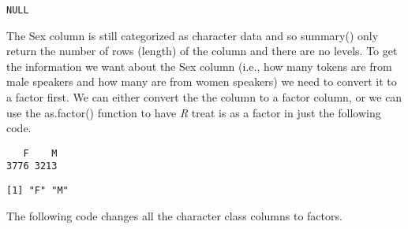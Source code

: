 \documentclass[
  10pt,
  letterpaper]{article}
\newenvironment{Shaded}{\begin{snugshade}}{\end{snugshade}}
\newcommand{\FunctionTok}[1]{\textcolor[rgb]{0.28,0.35,0.67}{#1}}
\newcommand{\NormalTok}[1]{\textcolor[rgb]{0.00,0.23,0.31}{#1}}
\newcommand{\SpecialCharTok}[1]{\textcolor[rgb]{0.37,0.37,0.37}{#1}}
\renewcommand\texttt[1]{{\ttfamily\color{BrickRed}#1}}
\begin{document}
\begin{verbatim}
NULL
\end{verbatim}

The \texttt{Sex} column is still categorized as \texttt{character} data
and so \texttt{summary()} only return the number of rows
(\texttt{length}) of the column and there are no levels. To get the
information we want about the \texttt{Sex} column (i.e., how many tokens
are from male speakers and how many are from women speakers) we need to
convert it to a factor first. We can either convert the the column to a
factor column, or we can use the \texttt{as.factor()} function to have
\emph{R} treat is as a factor in just the following code.

\begin{Shaded}
\end{Shaded}

\begin{verbatim}
   F    M 
3776 3213 
\end{verbatim}

\begin{Shaded}
\end{Shaded}

\begin{verbatim}
[1] "F" "M"
\end{verbatim}

The following code changes all the character class columns to factors.
\end{document}
